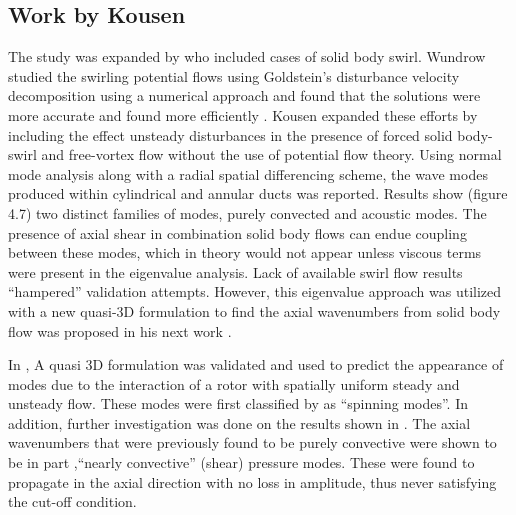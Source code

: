 \subsection{Work by Kousen}
The study was expanded by \cite{Kerrebrock1977,Yousefian1975,Yurkovich498} who
included cases of solid body swirl. Wundrow studied the swirling potential flows using Goldstein's disturbance velocity
decomposition \cite{ME1978} using a numerical approach and found that the solutions
were more accurate and found more efficiently \cite{Wundrow2019}. Kousen expanded these efforts by including \cite{Kousen1999} the effect unsteady disturbances in the presence of 
forced solid body-swirl and free-vortex flow without the use of potential flow theory. Using normal 
mode analysis along with a radial spatial differencing scheme, the wave modes produced within cylindrical and annular ducts was 
reported. Results show (figure 4.7) two distinct families of modes, purely convected and acoustic 
modes. The presence of axial shear in combination solid body flows can endue coupling between these modes, which 
in theory would not appear unless viscous terms were present in the eigenvalue analysis. Lack of available swirl flow 
results ``hampered'' validation attempts. However, this eigenvalue approach was utilized with a new quasi-3D 
formulation to find the axial wavenumbers from solid body flow was proposed in his next work . 

In \cite{Kousen1996}, A quasi 3D formulation was validated and used to predict 
the appearance of modes due to the interaction of a rotor with spatially 
uniform steady and unsteady flow. These modes were first classified by 
\cite{Tyler1962} as ``spinning modes''. In addition, further investigation was 
done on the results shown in \cite{Kousen1999}. The axial wavenumbers that 
were previously found to be purely convective were shown to be in part
,``nearly convective'' (shear) pressure modes. These were found to propagate in the 
axial direction with no loss in amplitude, thus never satisfying the cut-off condition. 

